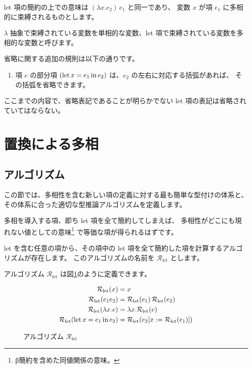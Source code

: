 let 項の簡約の上での意味は $(\lambda x . e_2) \, e_1$ と同一であり、
変数 $x$ が項 $e_1$ に多相的に束縛されるものとします。

$\lambda$ 抽象で束縛されている変数を単相的な変数、let 項で束縛されている変数を多相的な変数と呼びます。

省略に関する追加の規則は以下の通りです。

\begin{enumerate}
  \item 項 $e$ の部分項 $(\mathrm{let} \, x = e_1 \, \mathrm{in} \, e_2)$ は、$e_2$ の左右に対応する括弧があれば、
        その括弧を省略できます。
\end{enumerate}

\begin{note}
ここまでの内容で、省略表記であることが明らかでない let 項の表記は省略されていてはならない。
\end{note}

\section{置換による多相}

\subsection{アルゴリズム}

この節では、多相性を含む新しい項の定義に対する最も簡単な型付けの体系と、
その体系に合った適切な型推論アルゴリズムを定義します。

多相を導入する項、即ち let 項を全て簡約してしまえば、
多相性がどこにも現れない値としての意味\footnote{β簡約を含めた同値関係の意味。}
で等価な項が得られるはずです。

let を含む任意の項から、その項中の let 項を全て簡約した項を計算するアルゴリズムが存在します。
このアルゴリズムの名前を $\mathcal R_\mathrm{let}$ とします。

アルゴリズム $\mathcal R_\mathrm{let}$ は図\ref{fig:algorithm-rlet}のように定義できます。

\begin{figure}[htbp]
  \begin{align*}
    \mathcal R_\mathrm{let}(x) &= x \\
    \mathcal R_\mathrm{let}(e_1 e_2) &=
      \mathcal R_\mathrm{let}(e_1) \, \mathcal R_\mathrm{let}(e_2) \\
    \mathcal R_\mathrm{let}(\lambda x . e) &=
      \lambda x . \mathcal R_\mathrm{let}(e) \\
    \mathcal R_\mathrm{let}(\mathrm{let} \, x = e_1 \, \mathrm{in} \, e_2) &=
      \mathcal R_\mathrm{let}(e_2 [x := \mathcal R_\mathrm{let}(e_1)])
  \end{align*}
  \caption{アルゴリズム $\mathcal R_\mathrm{let}$}
  \label{fig:algorithm-rlet}
\end{figure}

